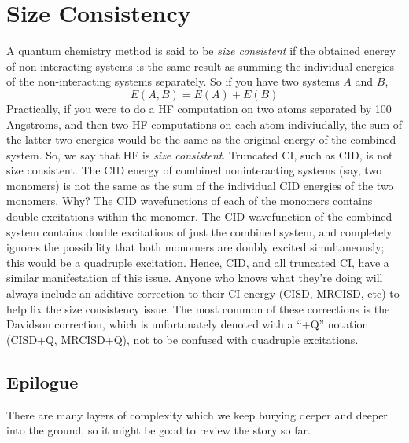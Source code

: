 \documentclass{article}
\begin{document}
\section{Size Consistency}
A quantum chemistry method is said to be \textit{size consistent} if the obtained energy of non-interacting systems
is the same result as summing the individual energies of the non-interacting systems separately.
So if you have two systems $A$ and $B$, 
\[E(A,B) = E(A) + E(B) \]
Practically, if you were to do a HF computation on two atoms separated by 100 Angstroms, and then two HF computations on each atom indiviudally, 
the sum of the latter two energies would be the same as the original energy of the combined system.
So, we say that HF is \textit{size consistent}.
Truncated CI, such as CID, is not size consistent.
The CID energy of combined noninteracting systems (say, two monomers) is not the same as the sum of the individual CID energies of the two monomers.
Why? The CID wavefunctions of each of the monomers contains double excitations within the monomer.
The CID wavefunction of the combined system contains double excitations of just the combined system,
and completely ignores the possibility that both monomers are doubly excited simultaneously; this would be a quadruple excitation.
Hence, CID, and all truncated CI, have a similar manifestation of this issue.
Anyone who knows what they're doing will always include an additive correction to their CI energy (CISD, MRCISD, etc)
    to help fix the size consistency issue.
The most common of these corrections is the Davidson correction,
    which is unfortunately denoted with a ``+Q'' notation (CISD+Q, MRCISD+Q), not to be confused with quadruple excitations.




\subsection{Epilogue}
There are many layers of complexity which we keep burying deeper and deeper into the ground, so it might be good to review the story so far. 
\end{document}
